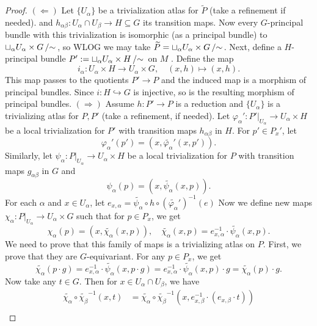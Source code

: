\documentclass[10pt, a4paper]{article}
\newenvironment{noticeC}{%
  \tcolorbox[%
  notitle,
  empty,
  enhanced,  %
  breakable,
  coltext=black, 
  fontupper=\rmfamily,
  noparskip,
  sharp corners,
  boxrule=-1pt,  %
  frame hidden,
  left=7pt,  %
  right=7pt,
  top=5pt,
  bottom=5pt,
  before skip=2.5ex plus 2pt,
  after skip=2.5ex plus 2pt,
  overlay unbroken and last={%
  },
  ]}
{\endtcolorbox}
\newenvironment{myproof}%
  {\begin{noticeC}\begin{proof}}%
  {\end{proof}\end{noticeC}}
\newcommand{\quot}[2]{{\raisebox{0em}{$#1$}\left/\raisebox{0em}{$#2$}\right.}}
\begin{document}
\begin{myproof}
  $(\Leftarrow)$ 
  Let $\{U_\alpha\}$ be a trivialization atlas for $\widetilde{P}$ (take a refinement if needed).
  and $h_{\alpha \beta}: U_\alpha \cap U_\beta \to H \subseteq G$ its transition maps.
  Now every $G$-principal bundle with this trivialization is isomorphic (as a principal bundle) to $\quot{\sqcup_\alpha U_\alpha \times G}{\sim}$,
  so WLOG we may take $\widetilde{P} = \quot{\sqcup_\alpha U_\alpha \times G}{\sim}$.
  Next, define a $H$-principal bundle $P' := \quot{\sqcup_\alpha U_\alpha \times H}{\sim}$ on $M$ .
  Define the map
  $$i_\alpha: U_\alpha \times H \to U_\alpha \times G,\quad (x, h) \mapsto (x, h).$$
  This map passes to the quotients $P' \to P$ and the induced map is a morphism of principal bundles.
  Since $i : H \hookrightarrow G$ is injective, so is the resulting morphism of principal bundles.
  $(\Rightarrow)$ Assume $h: P' \to P$ is a reduction and $\{U_\alpha\}$ is a trivializing atlas for $P, P'$ (take a refinement, if needed).
  Let $\varphi_\alpha ': P' \big|_{U_\alpha} \to U_\alpha \times H$ be a local trivialization for $P'$ with transition maps $h_{\alpha \beta}$ in $H$.
  For $p' \in P_{x} '$, let
  $$\varphi_\alpha ' (p') = (x, \widetilde{\varphi_\alpha} ' (x, p')).$$
  Similarly, let $\psi_\alpha : P \big|_{U_\alpha} \to U_\alpha \times H$ be a local trivialization for $P$ with transition maps $g_{\alpha \beta}$ in $G$ and 
  $$\psi_\alpha  (p) = (x, \widetilde{\psi_\alpha}  (x, p)).$$
  For each $\alpha$ and $x \in U_\alpha$, let $e_{x, \alpha} = \widetilde{\psi_\alpha} \circ h \circ (\widetilde{\varphi_\alpha} ')^{-1} (e)$
  Now we define new maps 
  $\chi_\alpha: P\big|_{U_\alpha} \to U_\alpha \times G$
  such that for $p \in P_x$, we get 
  $$\chi_\alpha (p) = (x, \widetilde{\chi_\alpha} (x, p)),\quad \widetilde{\chi_\alpha} (x, p) = e_{x, \alpha} ^{-1} \cdot \widetilde{\psi_\alpha} (x, p).$$
  We need to prove that this family of maps is a trivializing atlas on $P$.
  First, we prove that they are $G$-equivariant. For any $p \in P_x$, we get 
  $$\widetilde{\chi_\alpha} (p \cdot g) = e_{x, \alpha}^{-1} \cdot \widetilde{\psi_\alpha} (x, p \cdot g) = e_{x, \alpha}^{-1} \cdot \widetilde{\psi_\alpha} (x, p) \cdot g = \widetilde{\chi_\alpha} (p) \cdot g.$$
  Now take any $t \in G$. Then for $x \in U_\alpha \cap U_\beta$, we have 
  \begin{align*}
    \widetilde{\chi_\alpha} \circ \widetilde{\chi_\beta} ^{-1} (x, t) &= \widetilde{\chi_\alpha} \circ \widetilde{\chi_\beta} ^{-1} (x, e_{x, \beta}^{-1} \cdot (e_{x, \beta} \cdot t))\\

\end{align*}
\end{myproof}
\end{document}

